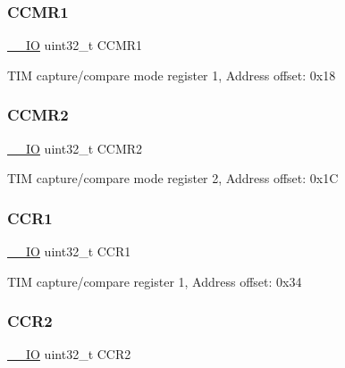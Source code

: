\subsubsection{\texorpdfstring{C\+C\+M\+R1}{CCMR1}}
{\footnotesize\ttfamily \mbox{\hyperlink{core__sc300_8h_aec43007d9998a0a0e01faede4133d6be}{\+\_\+\+\_\+\+IO}} uint32\+\_\+t C\+C\+M\+R1}

T\+IM capture/compare mode register 1, Address offset\+: 0x18 \mbox{\label{struct_t_i_m___type_def_a091452256c9a16c33d891f4d32b395bf}} 
\subsubsection{\texorpdfstring{C\+C\+M\+R2}{CCMR2}}
{\footnotesize\ttfamily \mbox{\hyperlink{core__sc300_8h_aec43007d9998a0a0e01faede4133d6be}{\+\_\+\+\_\+\+IO}} uint32\+\_\+t C\+C\+M\+R2}

T\+IM capture/compare mode register 2, Address offset\+: 0x1C \mbox{\label{struct_t_i_m___type_def_adab1e24ef769bbcb3e3769feae192ffb}} 
\subsubsection{\texorpdfstring{C\+C\+R1}{CCR1}}
{\footnotesize\ttfamily \mbox{\hyperlink{core__sc300_8h_aec43007d9998a0a0e01faede4133d6be}{\+\_\+\+\_\+\+IO}} uint32\+\_\+t C\+C\+R1}

T\+IM capture/compare register 1, Address offset\+: 0x34 \mbox{\label{struct_t_i_m___type_def_ab90aa584f07eeeac364a67f5e05faa93}} 
\subsubsection{\texorpdfstring{C\+C\+R2}{CCR2}}
{\footnotesize\ttfamily \mbox{\hyperlink{core__sc300_8h_aec43007d9998a0a0e01faede4133d6be}{\+\_\+\+\_\+\+IO}} uint32\+\_\+t C\+C\+R2}

